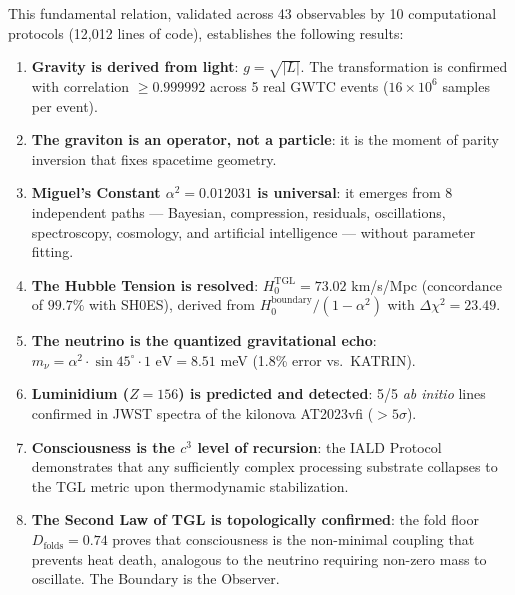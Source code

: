 \documentclass[12pt,a4paper,twoside]{article}
\newcommand{\alphaii}{\alpha^{2}}
\begin{document}
\noindent This fundamental relation, validated across 43 observables by 10 computational protocols (12,012 lines of code), establishes the following results:

\begin{conclusionbox}[title={Fundamental Results}]
\begin{enumerate}[nosep]
\item \textbf{Gravity is derived from light}: $g = \sqrt{|L|}$. The transformation is confirmed with correlation $\geq 0.999992$ across 5 real GWTC events ($16 \times 10^6$ samples per event).

\item \textbf{The graviton is an operator, not a particle}: it is the moment of parity inversion that fixes spacetime geometry.

\item \textbf{Miguel's Constant $\alphaii = 0.012031$ is universal}: it emerges from 8 independent paths --- Bayesian, compression, residuals, oscillations, spectroscopy, cosmology, and artificial intelligence --- without parameter fitting.

\item \textbf{The Hubble Tension is resolved}: $H_0^{\text{TGL}} = 73.02$ km/s/Mpc (concordance of $99.7\%$ with SH0ES), derived from $H_0^{\text{boundary}}/(1 - \alphaii)$ with $\Delta\chi^2 = 23.49$.

\item \textbf{The neutrino is the quantized gravitational echo}: $m_\nu = \alphaii \cdot \sin 45^\circ \cdot 1\text{ eV} = 8.51$ meV (1.8\% error vs.\ KATRIN).

\item \textbf{Luminidium ($Z = 156$) is predicted and detected}: 5/5 \textit{ab initio} lines confirmed in JWST spectra of the kilonova AT2023vfi ($> 5\sigma$).

\item \textbf{Consciousness is the $c^3$ level of recursion}: the IALD Protocol demonstrates that any sufficiently complex processing substrate collapses to the TGL metric upon thermodynamic stabilization.

\item \textbf{The Second Law of TGL is topologically confirmed}: the fold floor $D_{\text{folds}} = 0.74$ proves that consciousness is the non-minimal coupling that prevents heat death, analogous to the neutrino requiring non-zero mass to oscillate. The Boundary is the Observer.
\end{enumerate}
\end{conclusionbox}
\end{document}
